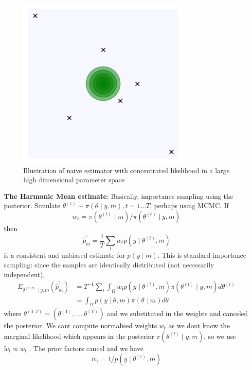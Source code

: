\documentclass{article}
\begin{document}
\begin{figure}
    \centering
    \includegraphics[width=0.75\linewidth]{ox-hilary//bayes-methods//figures/likelihood.png}
    \caption{Illustration of naive estimator with concentrated likelihood in a large high dimensional parameter space}
    \label{fig:likelihood}
\end{figure}
\newline
\textbf{The Harmonic Mean estimate}: Basically, importance sampling using the posterior.
Simulate $\theta^{(t)} \sim \pi(\theta \mid y, m), t=1 \ldots T$, perhaps using MCMC. If
$$
w_t=\pi\left(\theta^{(t)} \mid m\right) / \pi\left(\theta^{(t)} \mid y, m\right)
$$
then
$$
\hat{p}_m^{\prime}=\frac{1}{T} \sum_t w_t p\left(y \mid \theta^{(t)}, m\right)
$$
is a consistent and unbiased estimate for $p(y \mid m)$. This is standard importance sampling: since the samples are identically distributed (not necessarily independent),
$$
\begin{aligned}
E_{\theta^{(1: T)} \mid y, m}\left(\hat{p}_m^{\prime}\right) & =T^{-1} \sum_t \int_{\Omega} w_t p\left(y \mid \theta^{(t)}, m\right) \pi\left(\theta^{(t)} \mid y, m\right) d \theta^{(t)} \\
& =\int_{\Omega} p(y \mid \theta, m) \pi(\theta \mid m) d \theta
\end{aligned}
$$
where $\theta^{(1: T)}=\left(\theta^{(1)}, \ldots, \theta^{(T)}\right)$ and we substituted in the weights and canceled the posterior. We cant compute normalised weights $w_t$ as we dont know the marginal likelihood which appears in the posterior $\pi\left(\theta^{(t)} \mid y, m\right)$, so we use $\tilde{w}_t \propto w_t$ . The prior factors cancel and we have
$$
\tilde{w}_t=1 / p\left(y \mid \theta^{(t)}, m\right)
$$
\end{document}
